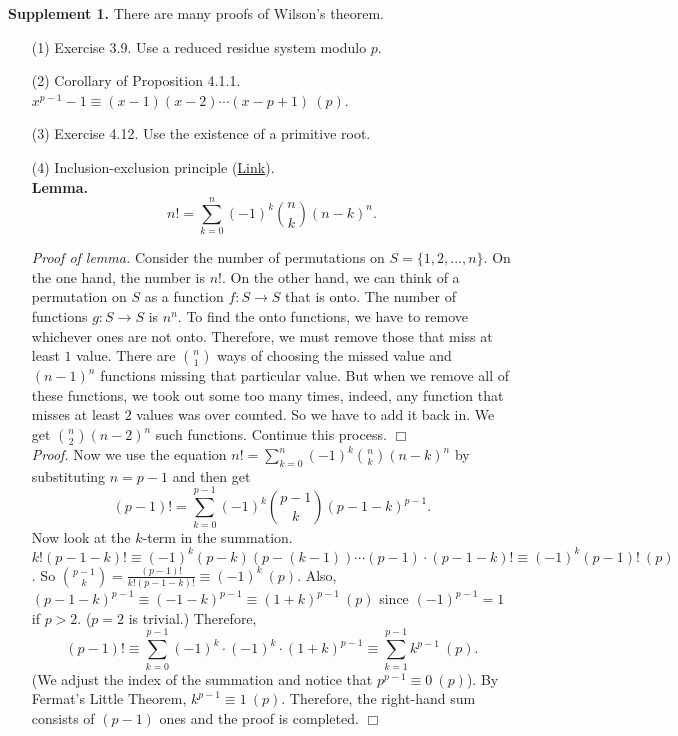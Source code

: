 \documentclass{article}
\begin{document}
\textbf{Supplement 1.}
There are many proofs of Wilson's theorem.
\begin{enumerate}
\item[(1)]
Exercise 3.9. Use a reduced residue system modulo $p$.
\item[(2)]
Corollary of Proposition 4.1.1. $x^{p - 1} - 1 \equiv (x - 1)(x - 2) \cdots (x - p + 1) \: (p)$.
\item[(3)]
Exercise 4.12. Use the existence of a primitive root.
\item[(4)]
Inclusion-exclusion principle
(\href{http://campus.lakeforest.edu/trevino/WilsonCapsule.pdf}{Link}). \\
\textbf{Lemma.}
$$n! = \sum_{k = 0}^{n}(-1)^k {n \choose k} (n - k)^{n}.$$

\emph{Proof of lemma.}
Consider the number of permutations on $S = \{1, 2, ..., n\}$.
On the one hand, the number is $n!$.
On the other hand, we can think of a permutation on $S$ as a function
$f: S \rightarrow S$ that is onto.
The number of functions $g: S \rightarrow S$ is $n^n$.
To find the onto functions, we have to remove whichever ones are not onto.
Therefore, we must remove those that miss at least $1$ value.
There are ${n \choose 1}$ ways of choosing the missed value and ${(n - 1)}^n$
functions missing that particular value.
But when we remove all of these functions, we took out some too many times, indeed,
any function that misses at least $2$ values was over counted. So we have to add it back in.
We get ${n \choose 2} {(n - 2)}^n$ such functions. Continue this process.
$\Box$ \\

\emph{Proof.}
Now we use the equation $n! = \sum_{k = 0}^{n}(-1)^k {n \choose k} (n - k)^{n}$
by substituting $n = p - 1$ and then get
$$(p - 1)! = \sum_{k = 0}^{p - 1}(-1)^k {p - 1 \choose k} (p - 1 - k)^{p - 1}.$$
Now look at the $k$-term in the summation. \\

$k!(p - 1 - k)! \equiv (-1)^k (p - k)(p - (k - 1)) \cdots (p - 1) \cdot (p - 1 - k)!
\equiv (-1)^k (p - 1)! \: (p)$.
So ${p - 1 \choose k} = \frac{(p - 1)!}{k!(p - 1 - k)!} \equiv (-1)^k \: (p)$.
Also, ${(p - 1 - k)}^{p - 1} \equiv {(-1 - k)}^{p - 1} \equiv {(1 + k)}^{p - 1} \: (p)$
since $(-1)^{p - 1} = 1$ if $p > 2$. ($p = 2$ is trivial.) Therefore,
$$(p - 1)!
\equiv \sum_{k = 0}^{p - 1}(-1)^k \cdot (-1)^k \cdot {(1 + k)}^{p - 1}
\equiv \sum_{k = 1}^{p - 1} k^{p - 1} \: (p).$$
(We adjust the index of the summation and notice that $p^{p - 1} \equiv 0 \: (p)$).
By Fermat’s Little Theorem, $k^{p - 1} \equiv 1 \: (p)$.
Therefore, the right-hand sum consists of $(p - 1)$ ones and the proof is completed.
$\Box$ \\


\end{enumerate}
\end{document}
